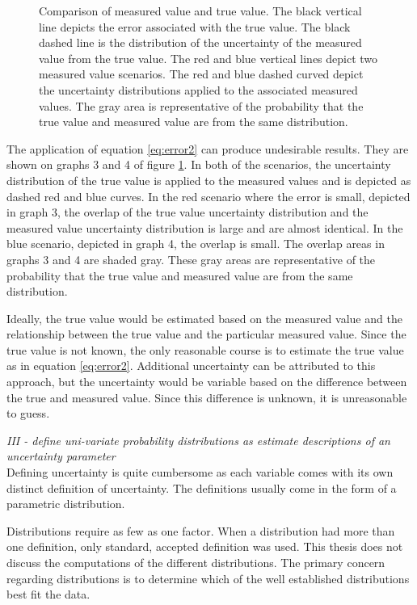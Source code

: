 \begin{linenumbers}
\begin{figure}[htbp]
\begin{center}
	\caption[Comparison of measured value and true value]{Comparison of measured value and true value.  The black vertical line depicts the error associated with the true value.  The black dashed line is the distribution of the uncertainty of the measured value from the true value.  The red and blue vertical lines depict two measured value scenarios.  The red and blue dashed curved depict the uncertainty distributions applied to the associated measured values.  The gray area is representative of the probability that the true value and measured value are from the same distribution.}
	\label{fig:TV-MVError}
\end{center}
\end{figure}

The application of equation \ref{eq:error2} can produce undesirable results.  They are shown on graphs 3 and 4 of figure \ref{fig:TV-MVError}.  In both of the scenarios, the uncertainty distribution of the true value is applied to the measured values and is depicted as dashed red and blue curves.  In the red scenario where the error is small, depicted in graph 3, the overlap of the true value uncertainty distribution and the measured value uncertainty distribution is large and are almost identical.  In the blue scenario, depicted in graph 4, the overlap is small.  The overlap areas in graphs 3 and 4 are shaded gray.  These gray areas are representative of the probability that the true value and measured value are from the same distribution.

Ideally, the true value would be estimated based on the measured value and the relationship between the true value and the particular measured value.  Since the true value is not known, the only reasonable course is to estimate the true value as in equation \ref{eq:error2}.  Additional uncertainty can be attributed to this approach, but the uncertainty would be variable based on the difference between the true and measured value.  Since this difference is unknown, it is unreasonable to guess.

\emph{III - define uni-variate probability distributions as estimate descriptions of an uncertainty parameter}\\

Defining uncertainty is quite cumbersome as each variable comes with its own distinct definition of uncertainty.  The definitions usually come in the form of a parametric distribution.

Distributions require as few as one factor.  When a distribution had more than one definition, only standard, accepted definition was used.  This thesis does not discuss the computations of the different distributions.  The primary concern regarding distributions is to determine which of the well established distributions best fit the data.





\end{linenumbers}
